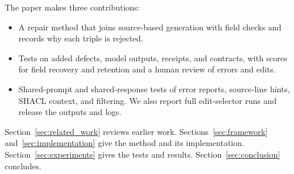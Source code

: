 The paper makes three contributions:
\begin{itemize}
    \item A repair method that joins source-based generation with field
    checks and records why each triple is rejected.
    \item Tests on added defects, model outputs, receipts, and contracts,
    with scores for field recovery and retention and a human review of
    errors and edits.
    \item Shared-prompt and shared-response tests of error reports,
    source-line hints, SHACL context, and filtering. We also report full
    edit-selector runs and release the outputs and logs.
\end{itemize}

Section~\ref{sec:related_work} reviews earlier work.
Sections~\ref{sec:framework} and~\ref{sec:implementation} give the method
and its implementation. Section~\ref{sec:experiments} gives the tests and
results. Section~\ref{sec:conclusion} concludes.
